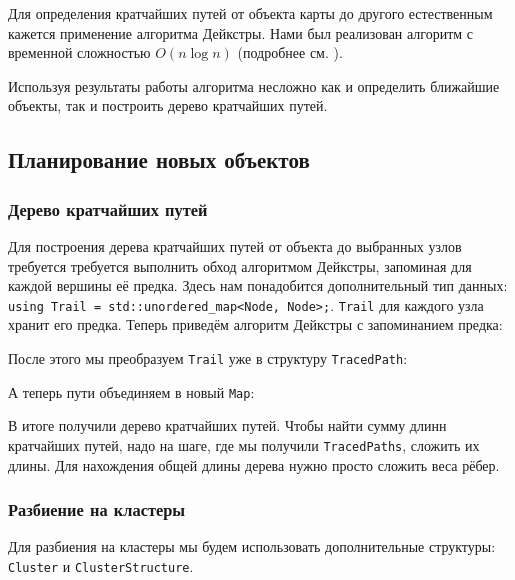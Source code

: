 \documentclass[11pt]{article}
\begin{document}
    Для определения кратчайших путей от объекта карты до другого естественным кажется применение алгоритма Дейкстры.
    Нами был реализован алгоритм с временной сложностью $ O(n \log n) $ (подробнее см. ).
    
    
    
    Используя результаты работы алгоритма несложно как и определить ближайшие объекты, так и построить дерево кратчайших путей.
    
	\subsection{Планирование новых объектов}
	
	\subsubsection{Дерево кратчайших путей}
		
	Для построения дерева кратчайших путей от объекта до выбранных узлов требуется требуется выполнить обход алгоритмом Дейкстры, запоминая для каждой вершины её предка. Здесь нам понадобится дополнительный тип данных: \texttt{using Trail = std::unordered\_map<Node, Node>;}. \texttt{Trail} для каждого узла хранит его предка. Теперь приведём алгоритм Дейкстры с запоминанием предка:
	
	

	После этого мы преобразуем \texttt{Trail} уже в структуру \texttt{TracedPath}:

	

	А теперь пути объединяем в новый \texttt{Map}:

	

	В итоге получили дерево кратчайших путей. Чтобы найти сумму длинн кратчайших путей, надо на шаге, где мы получили \texttt{TracedPaths}, сложить их длины. Для нахождения общей длины дерева нужно просто сложить веса рёбер.

	\subsubsection{Разбиение на кластеры}

	Для разбиения на кластеры мы будем использовать дополнительные структуры: \texttt{Cluster} и \texttt{ClusterStructure}.
	
\end{document}
